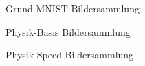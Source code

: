 \newpage
\begin{figure}[!ht]
    \centering
    \caption{Grund-MNIST Bildersammlung}
    \label{fig:Grund-MNIST}
\end{figure}


\begin{figure}[!ht]
    \centering
    \caption{Physik-Basis Bildersammlung}\label{fig:Physik-Basis}
\end{figure}

\begin{figure}[!ht]
    \centering
    \caption{Physik-Speed Bildersammlung}
    \label{fig:Physik-Speed}
\end{figure}
